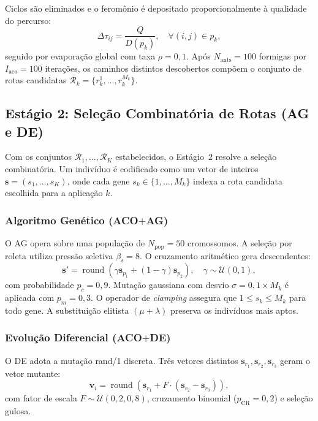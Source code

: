 \documentclass[journal]{IEEEtran}
\begin{document}
Ciclos s\~{a}o eliminados e o ferom\^{o}nio \'{e} depositado proporcionalmente \`{a} qualidade do percurso:
\begin{equation}
\Delta \tau_{ij} = \frac{Q}{D(p_k)}, \quad \forall (i, j) \in p_k,
\end{equation}
seguido por evapora\c{c}\~{a}o global com taxa $\rho = 0,1$. Ap\'{o}s $N_{\text{ants}} = 100$ formigas por $I_{\text{aco}} = 100$ itera\c{c}\~{o}es, os caminhos distintos descobertos comp\~{o}em o conjunto de rotas candidatas $\mathcal{R}_k = \{r_k^1, \dots, r_k^{M_k}\}$.

\subsection{Est\'{a}gio 2: Sele\c{c}\~{a}o Combinat\'{o}ria de Rotas (AG e DE)}
Com os conjuntos $\mathcal{R}_1, \dots, \mathcal{R}_K$ estabelecidos, o Est\'{a}gio~2 resolve a sele\c{c}\~{a}o combinat\'{o}ria. Um indiv\'{i}duo \'{e} codificado como um vetor de inteiros $\mathbf{s} = (s_1, \dots, s_K)$, onde cada gene $s_k \in \{1, \dots, M_k\}$ indexa a rota candidata escolhida para a aplica\c{c}\~{a}o $k$.

\subsubsection{Algoritmo Gen\'{e}tico (ACO$+$AG)}
O AG opera sobre uma popula\c{c}\~{a}o de $N_{\text{pop}} = 50$ cromossomos. A sele\c{c}\~{a}o por roleta utiliza press\~{a}o seletiva $\beta_s = 8$. O cruzamento aritm\'{e}tico gera descendentes:
\begin{equation}
\mathbf{s}' = \operatorname{round}\left( \gamma \mathbf{s}_{p_1} + (1 - \gamma)\mathbf{s}_{p_2} \right), \quad \gamma \sim \mathcal{U}(0, 1),
\end{equation}
com probabilidade $p_c = 0,9$. Muta\c{c}\~{a}o gaussiana com desvio $\sigma = 0,1 \times M_k$ \'{e} aplicada com $p_m = 0,3$. O operador de \emph{clamping} assegura que $1 \le s_k \le M_k$ para todo gene. A substitui\c{c}\~{a}o elitista $(\mu + \lambda)$ preserva os indiv\'{i}duos mais aptos.

\subsubsection{Evolu\c{c}\~{a}o Diferencial (ACO$+$DE)}
O DE adota a muta\c{c}\~{a}o rand/1 discreta. Tr\^{e}s vetores distintos $\mathbf{s}_{r_1}, \mathbf{s}_{r_2}, \mathbf{s}_{r_3}$ geram o vetor mutante:
\begin{equation}
\mathbf{v}_i = \operatorname{round}\left( \mathbf{s}_{r_1} + F \cdot (\mathbf{s}_{r_2} - \mathbf{s}_{r_3}) \right),
\end{equation}
com fator de escala $F \sim \mathcal{U}(0,2, 0,8)$, cruzamento binomial ($p_{\text{CR}} = 0,2$) e sele\c{c}\~{a}o gulosa.
\end{document}

